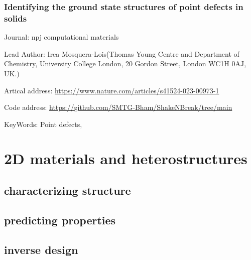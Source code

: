 \documentclass[11pt]{elegantbook}
\begin{document}
\subsection{Identifying the ground state structures of point defects in solids}
\begin{brief}
    \item Journal: npj computational materials
    \item Lead Author: Irea Mosquera-Lois(Thomas Young Centre and Department of Chemistry, University College London, 20 Gordon Street, London WC1H 0AJ, UK.)
    \item Artical address: \href{https://www.nature.com/articles/s41524-023-00973-1}{https://www.nature.com/articles/s41524-023-00973-1}
    \item Code address: \href{https://github.com/SMTG-Bham/ShakeNBreak/tree/main}{https://github.com/SMTG-Bham/ShakeNBreak/tree/main}
    \item KeyWords: Point defects, 
\end{brief}







\chapter{2D materials and heterostructures}
\section{characterizing structure}





\section{predicting properties}






\section{inverse design}
\end{document}
